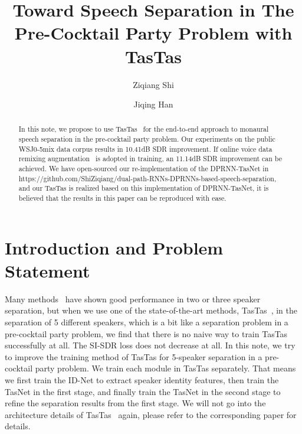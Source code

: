 \documentclass{article}
\title{Toward Speech Separation in The Pre-Cocktail Party Problem with TasTas}
\author[1]{Ziqiang Shi}
\author[2]{Jiqing Han}
\affil[1]{Fujitsu Research and Development Center, Beijing, China}
\affil[2]{Harbin Institute of Technology, Harbin, China}
\date{}
\numberwithin{equation}{section}
\theoremstyle{remark}
\begin{document}
\maketitle

\renewcommand{\thefootnote}{\fnsymbol{footnote}}



\begin{abstract}
  In this note,
  we propose to use TasTas~\cite{shi2020speech} for the end-to-end 
  approach to monaural speech separation in the pre-cocktail party problem. 
  Our experiments on the public WSJ0-5mix data corpus results in 10.41dB SDR improvement. 
  If online voice data remixing augmentation~\cite{zeghidour2020wavesplit} is adopted in training, 
  an 11.14dB SDR improvement can be achieved.
  We have open-sourced our re-implementation of the
  DPRNN-TasNet in 
  https://github.com/ShiZiqiang/dual-path-RNNs-DPRNNs-based-speech-separation, 
  and our TasTas
  is realized based on this implementation of DPRNN-TasNet, it is believed that 
  the results in this paper can be reproduced with ease.
\end{abstract}
\section{Introduction and Problem Statement}
\label{sec:introduction}



Many methods~\cite{luo2017tasnet,luo2018tasnet,venkataramani2017adaptive,shi2019end, shi2019deep, zhang2020furcanext,luo2019dual,zeghidour2020wavesplit,nachmani2020voice,shi2020speech} 
have shown good performance in two or three speaker separation,
but when we use one of the state-of-the-art methods, TasTas~\cite{shi2020speech}, in the separation of 5 different speakers,
which is a bit like a separation problem in a pre-cocktail party problem, we find 
that there is no naive way to train TasTas successfully at all.
The SI-SDR loss does not decrease at all.  In this note, we try to improve the 
training method of TasTas for 5-speaker separation in a pre-cocktail party problem.
We train each module in TasTas separately. That means we first 
train the ID-Net to extract speaker identity features, then train
the TasNet in the first stage, and finally train the TasNet in the second 
stage to refine the separation results from the first stage.
We will not go into 
the architecture details of 
TasTas~\cite{shi2020speech} again, please refer to the corresponding paper for details.
\end{document}
